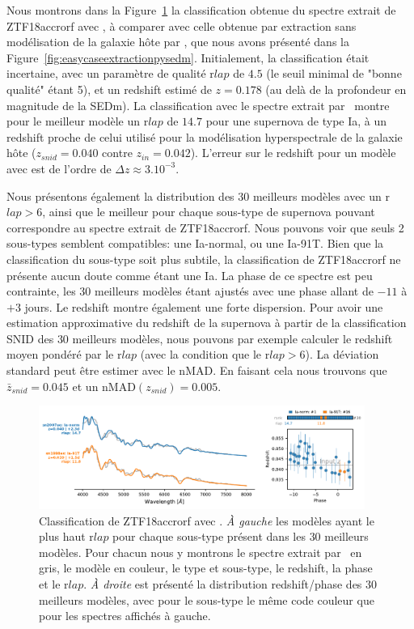 \documentclass[../main/main.tex]{subfiles}
\begin{document}
Nous montrons dans la Figure~\ref{fig:snidZTF18accrorf} la
classification obtenue du spectre extrait de ZTF18accrorf avec \hypergal, à comparer
avec celle obtenue par extraction sans modélisation de la galaxie hôte
par \pysedm, que nous avons présenté dans la
Figure~\ref{fig:easycaseextractionpysedm}. Initialement, la
classification était incertaine, avec un paramètre de qualité
r$lap$ de $4.5$ (le seuil minimal de "bonne qualité" étant 5), et un
redshift estimé de $z=0.178$ (au delà de la profondeur en magnitude de
la SEDm).
La classification avec le spectre extrait par \hypergal\ montre pour le
meilleur modèle un r$lap$ de $14.7$ pour une supernova de type Ia, à un
redshift proche de celui utilisé pour la modélisation hyperspectrale de
la galaxie hôte ($z_{snid}=0.040$
contre $z_{in}=0.042$). L'erreur sur le redshift pour un modèle avec  est
de l'ordre de $\Delta z\approx3.10^{-3}$. 

Nous présentons également la distribution des $30$ meilleurs modèles avec un
r$lap>6$, ainsi que le meilleur pour chaque sous-type de supernova
pouvant correspondre au spectre extrait de ZTF18accrorf. Nous pouvons
voir que seuls 2 sous-types semblent compatibles: une Ia-normal, ou une
Ia-91T. Bien que la classification du sous-type soit plus subtile, la
classification de ZTF18accrorf ne présente aucun doute comme étant une
Ia. La phase de ce spectre est peu contrainte, les $30$ meilleurs
modèles étant ajustés avec une phase allant de $-11$ à $+3$ jours.
Le redshift montre également une forte dispersion. Pour avoir une
estimation approximative du redshift de la supernova à partir de la
classification SNID des $30$ meilleurs modèles, nous pouvons par exemple calculer le redshift
moyen pondéré par le r$lap$ (avec la condition que le r$lap>6$). La
déviation standard peut être estimer avec le nMAD. En
faisant cela nous trouvons que $\bar{z}_{snid}=0.045$ et un nMAD$(z_{snid})=0.005$. 

\begin{figure}[ht]
  \centering
  \includegraphics[width=0.95\textwidth]{../figures/07_scene/ZTF18accrorf_snid_typing.pdf}
  \caption[Classification de ZTF18accrorf avec
  ]{Classification de ZTF18accrorf avec . \emph{À
      gauche} les modèles ayant le plus haut r$lap$ pour chaque
    sous-type présent dans les $30$ meilleurs modèles. Pour chacun nous
    y montrons le spectre extrait par \hypergal\ en gris, le modèle en couleur, le type et sous-type, le redshift, la phase et
  le r$lap$. \emph{À droite} est présenté la distribution
  redshift/phase des $30$ meilleurs modèles, avec pour le
  sous-type le même code couleur que pour les spectres affichés à gauche.}
  \label{fig:snidZTF18accrorf}
\end{figure}
\end{document}
